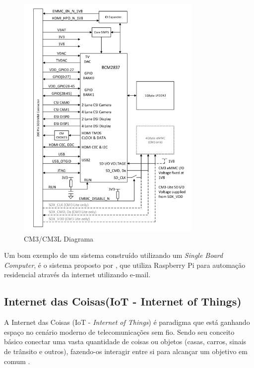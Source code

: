  \begin{figure}[H]
	\centering
    	\caption{\label{fig:raspsheet} CM3/CM3L Diagrama }
		\includegraphics[width = 0.8\textwidth]	{resources/raspsheet}
\end{figure}

\label{jain:raspberry}
Um bom exemplo de um sistema construído utilizando um \textit{Single Board Computer}, é o sistema proposto por , que utiliza Raspberry Pi para automação residencial através da internet utilizando e-mail. 


\subsection{Internet das Coisas(IoT - Internet of Things)}

A Internet das Coisas (IoT - \textit{Internet of Things}) é paradigma que está ganhando espaço no cenário moderno de telecomunicações sem fio. Sendo seu conceito básico conectar uma vasta quantidade de coisas ou objetos (casas, carros, sinais de trânsito e outros), fazendo-os interagir entre si para alcançar um objetivo em comum \cite{atzori2010internet}.



